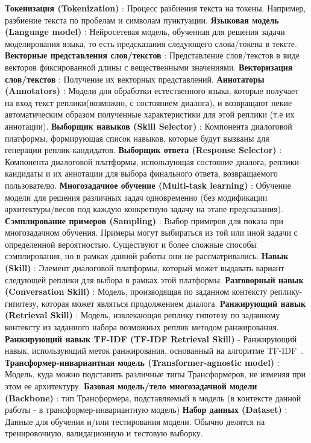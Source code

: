 \textbf{Токенизация (Tokenization)} : Процесс разбиения текста на токены. Например, разбиение текста по пробелам и символам пунктуации.
\textbf{Языковая модель (Language model)} : Нейросетевая модель, обученная для решения задачи моделирования языка, то есть предсказания следующего слова/токена в тексте.
\textbf{Векторные представления слов/текстов} : Представление слов/текстов в виде векторов фиксированной длины с вещественными значениями.
\textbf{Векторизация слов/текстов} : Получение их векторных представлений. 
\textbf{Аннотаторы (Annotators)} : Модели для обработки естественного языка, которые получает на вход текст реплики(возможно, с состоянием диалога), и возвращают некие автоматическим образом полученные характеристики для этой реплики (т.е их аннотации). 
\textbf{Выборщик навыков (Skill Selector)} : Компонента диалоговой платформы, формирующая список навыков, которые будут вызваны для генерации реплик-кандидатов.
\textbf{Выборщик ответа (Response Selector)} : Компонента диалоговой платформы, использующая состояние диалога, реплики-кандидаты и их аннотации для выбора финального ответа, возвращаемого пользователю.
\textbf{Многозадачное обучение (Multi-task learning)} : Обучение модели для решения различных задач одновременно (без модификации архитектуры/весов под каждую конкретную задачу на этапе предсказания).
\textbf{Сэмплирование примеров (Sampling)} : Выбор примеров для показа при многозадачном обучения. Примеры могут выбираться из той или иной задачи с определенной вероятностью. Существуют и более сложные способы сэмплирования, но в рамках данной работы они не рассматривались.
\textbf{Навык (Skill)} : Элемент диалоговой платформы, который может выдавать вариант следующей реплики для выбора в рамках этой платформы. 
\textbf{Разговорный навык (Conversation Skill)} : Модель, производящая по заданном контексту реплику-гипотезу, которая может являться продолжением диалога.
\textbf{Ранжирующий навык (Retrieval Skill)} : Модель, извлекающая реплику гипотезу по заданному контексту из заданного набора возможных реплик методом ранжирования.
\textbf{Ранжирующий навык TF-IDF (TF-IDF Retrieval Skill)} - Ранжирующий навык, использующий меток ранжирования, основанный на алгоритме TF-IDF~\cite{tfidf}. 
\textbf{Трансформер-инвариантная модель (Transformer-agnostic model)} : Модель, куда можно подставить различные типы Трансформеров, не  изменяя при этом ее архитектуру.
\textbf{Базовая модель/тело многозадачной модели (Backbone)} : тип Трансформера, подставляемый в модель (в контексте данной работы - в трансформер-инвариантную модель)
\textbf{Набор данных (Dataset)} : Данные для обучения и/или тестирования модели. Обычно делятся на тренировочную, валидационную и тестовую выборку. 
